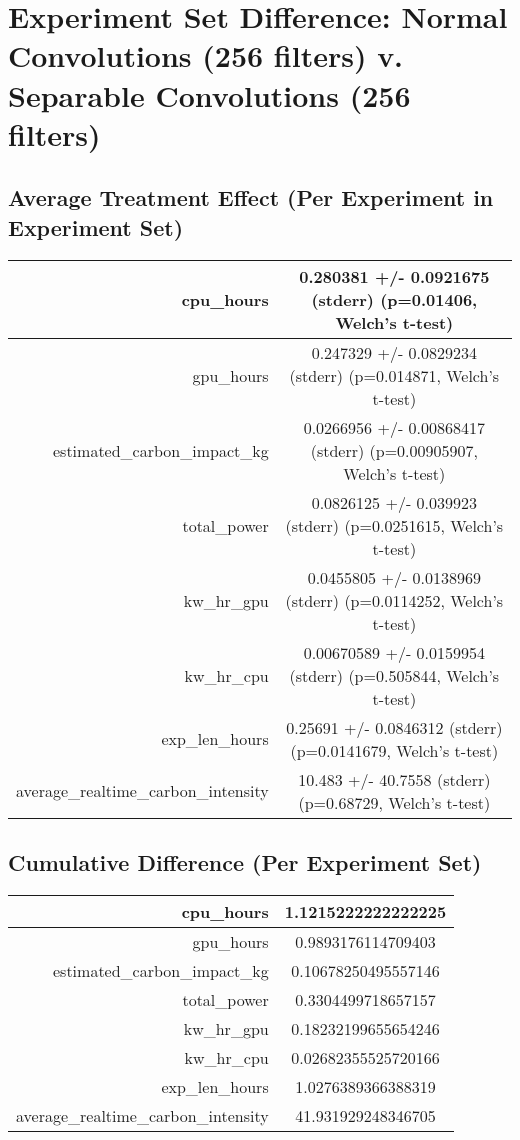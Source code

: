 \documentclass{article}%
\begin{document}
%
\normalsize%
\section{Experiment Set Difference: Normal Convolutions (256 filters) v. Separable Convolutions (256 filters)}%
\label{sec:Experiment Set Difference Normal Convolutions (256 filters) v. Separable Convolutions (256 filters)}%
\subsection{Average Treatment Effect (Per Experiment in Experiment Set)}%
\label{subsec:Average Treatment Effect (Per Experiment in Experiment Set)}%
\begin{tabular}{|r|c|}%
\hline%
cpu\_hours&0.280381 +/{-} 0.0921675 (stderr) (p=0.01406, Welch's t{-}test)\\%
\hline%
gpu\_hours&0.247329 +/{-} 0.0829234 (stderr) (p=0.014871, Welch's t{-}test)\\%
\hline%
estimated\_carbon\_impact\_kg&0.0266956 +/{-} 0.00868417 (stderr) (p=0.00905907, Welch's t{-}test)\\%
\hline%
total\_power&0.0826125 +/{-} 0.039923 (stderr) (p=0.0251615, Welch's t{-}test)\\%
\hline%
kw\_hr\_gpu&0.0455805 +/{-} 0.0138969 (stderr) (p=0.0114252, Welch's t{-}test)\\%
\hline%
kw\_hr\_cpu&0.00670589 +/{-} 0.0159954 (stderr) (p=0.505844, Welch's t{-}test)\\%
\hline%
exp\_len\_hours&0.25691 +/{-} 0.0846312 (stderr) (p=0.0141679, Welch's t{-}test)\\%
\hline%
average\_realtime\_carbon\_intensity&10.483 +/{-} 40.7558 (stderr) (p=0.68729, Welch's t{-}test)\\%
\hline%
\end{tabular}

%
\subsection{Cumulative Difference (Per Experiment Set)}%
\label{subsec:Cumulative Difference (Per Experiment Set)}%
\begin{tabular}{|r|c|}%
\hline%
cpu\_hours&1.1215222222222225\\%
\hline%
gpu\_hours&0.9893176114709403\\%
\hline%
estimated\_carbon\_impact\_kg&0.10678250495557146\\%
\hline%
total\_power&0.3304499718657157\\%
\hline%
kw\_hr\_gpu&0.18232199655654246\\%
\hline%
kw\_hr\_cpu&0.02682355525720166\\%
\hline%
exp\_len\_hours&1.0276389366388319\\%
\hline%
average\_realtime\_carbon\_intensity&41.931929248346705\\%
\hline%
\end{tabular}

%
\end{document}
